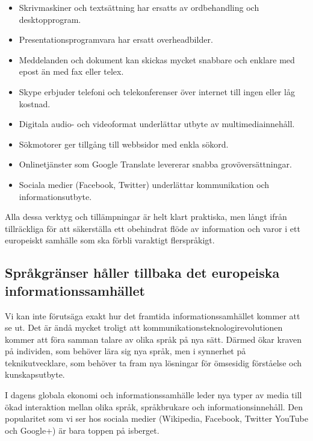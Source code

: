 \begin{multicols}{2}
\begin{itemize}[itemsep=0pt,parsep=0pt]
\item Skrivmaskiner och textsättning har ersatts av ordbehandling och
  desktopprogram.
\item Presentations\-programvara har ersatt over\-head\-bilder.
\item Meddelanden och dokument kan skickas mycket snabbare och enklare
  med epost än med fax eller telex.
\item Skype erbjuder telefoni och telekonferenser över internet till
  ingen eller låg kostnad.
\item Digitala audio- och videoformat underlättar utbyte av
  multi\-media\-innehåll.
\item Sökmotorer ger tillgång till webbsidor med enkla sökord.
\item Online\-tjänster som Google Translate levererar snabba
  grovöversättningar.
\item Sociala medier (Facebook, Twitter) underlättar kommunika\-tion
  och informations\-utbyte.
\end{itemize}

Alla dessa verktyg och tillämpningar är helt klart praktiska, men
långt ifrån tillräckliga för att säkerställa ett obehindrat flöde av
information och varor i ett europeiskt samhälle som ska förbli
varaktigt flerspråkigt.

\subsection{Språkgränser håller tillbaka det europe\-iska informa\-tions\-sam\-hället}
  
Vi kan inte förutsäga exakt hur det framtida in\-forma\-tions\-samhället
kommer att se ut. Det är ändå mycket troligt att
kom\-munika\-tions\-tekno\-logi\-revolu\-tion\-en kommer att föra
samman talare av olika språk på nya sätt. Därmed ökar kraven på
individen, som behöver lära sig nya språk, men i synnerhet på
teknik\-ut\-vecklare, som behöver ta fram nya lösningar för ömsesidig
förståelse och kunskapsutbyte.


I dagens globala ekonomi och informationssamhälle leder nya typer av
media till ökad interaktion mellan olika språk, språk\-brukare och
informationsinnehåll. Den popularitet som vi ser hos sociala medier
(Wikipedia, Facebook, Twitter YouTube och Google+) är bara toppen på
isberget.


\end{multicols}
